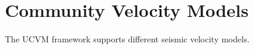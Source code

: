 \section{Community Velocity Models}
\label{sec:cvms}

The UCVM framework supports different seismic velocity models. 

